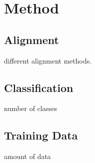 \chapter{Method} %
\label{cha:method}
\section{Alignment} %
\label{sec:alignment}
different alignment methods.

\section{Classification} %
\label{sec:classification}
number of classes

\section{Training Data} %
\label{sec:training_data}
amount of data

